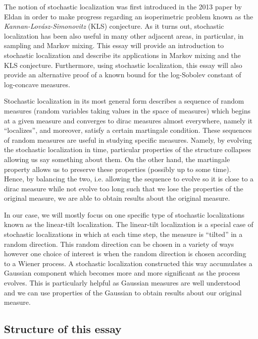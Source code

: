 The notion of stochastic localization was first introduced in the 2013 paper by Eldan \cite{Eldan_2013}
in order to make progress regarding an isoperimetric problem known as the 
\textit{Kannan-Lovász-Simonovitz} (KLS) conjecture. As it turns out, stochastic localization has been also 
useful in many other adjacent areas, in particular, in sampling and Markov mixing. This essay will 
provide an introduction to stochastic localization and describe its applications in Markov mixing and 
the KLS conjecture. Furthermore, using stochastic localization, this essay will also provide an alternative 
proof of a known bound for the log-Sobolev constant of log-concave measures. 

Stochastic localization in its most general form describes a sequence of random measures (random variables 
taking values in the space of measures) which begins at a given measure and converges to dirac 
measures almost everywhere, namely it ``localizes'', and moreover, satisfy a certain martingale 
condition. These sequences of random measures are useful in studying specific measures. Namely, 
by evolving the stochastic localization in time, particular properties of the structure collapses 
allowing us say something about them. On the other hand, the martingale property allows us to preserve 
these properties (possibly up to some time). Hence, by balancing the two, i.e. allowing the sequence 
to evolve so it is close to a dirac measure while not evolve too long such that we lose the properties 
of the original measure, we are able to obtain results about the original measure.

In our case, we will mostly focus on one specific type of stochastic localizations known as the 
linear-tilt localization. The linear-tilt localization is a special case of stochastic localizations 
in which at each time step, the measure is ``tilted'' in a random direction. This random direction 
can be chosen in a variety of ways however one choice of interest is when the random direction is 
chosen according to a Wiener process. A stochastic localization constructed this way accumulates a 
Gaussian component which becomes more and more significant as the process evolves. This is particularly 
helpful as Gaussian measures are well understood and we can use properties of the Gaussian to obtain 
results about our original measure.
\subsection{Structure of this essay}

